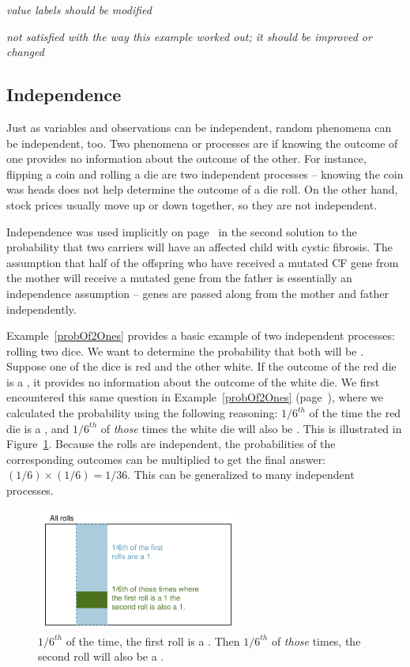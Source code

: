 \textit{value labels should be modified}

\textit{not satisfied with the way this example worked out; it should be improved or changed}

\subsection{Independence}
\label{probabilityIndependence}

Just as variables and observations can be independent, random phenomena can be independent, too. Two phenomena or processes are  if knowing the outcome of one provides no information about the outcome of the other. For instance, flipping a coin and rolling a die are two independent processes -- knowing the coin was heads does not help determine the outcome of a die roll. On the other hand, stock prices usually move up or down together, so they are not independent.

Independence was used implicitly on page~\pageref{CFInheritanceExample} in the second solution to the probability that two carriers will have an affected child with cystic fibrosis.  The assumption that half of the offspring who have received a mutated CF gene from the mother will receive a mutated gene from the father is essentially an independence assumption -- genes are passed along from the mother and father independently.

Example~\ref{probOf2Ones} provides a basic example of two independent processes: rolling two dice. We want to determine the probability that both will be . Suppose one of the dice is red and the other white. If the outcome of the red die is a , it provides no information about the outcome of the white die. We first encountered this same question in Example~\ref{probOf2Ones} (page~\pageref{probOf2Ones}), where we calculated the probability using the following reasoning: $1/6^{th}$ of the time the red die is a , and $1/6^{th}$ of \emph{those} times the white die will also be . This is illustrated in Figure~\ref{indepForRollingTwo1s}. Because the rolls are independent, the probabilities of the corresponding outcomes can be multiplied to get the final answer: $(1/6)\times(1/6)=1/36$. This can be generalized to many independent processes. 

\begin{figure}[hht]
\centering
\includegraphics[width=0.6\textwidth]{ch_probability/figures/indepForRollingTwo1s/indepForRollingTwo1s}
\caption{$1/6^{th}$ of the time, the first roll is a . Then $1/6^{th}$ of \emph{those} times, the second roll will also be a .}
\label{indepForRollingTwo1s}
\end{figure}

